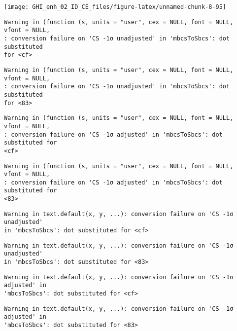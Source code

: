 \documentclass[
  10pt,
  a4paper,oneside]{article}
\begin{document}
\begin{center}\texttt{[image: GHI\_enh\_02\_ID\_CE\_files/figure-latex/unnamed-chunk-8-95]} \end{center}

\begin{verbatim}
Warning in (function (s, units = "user", cex = NULL, font = NULL, vfont = NULL,
: conversion failure on 'CS -1σ unadjusted' in 'mbcsToSbcs': dot substituted
for <cf>
\end{verbatim}

\begin{verbatim}
Warning in (function (s, units = "user", cex = NULL, font = NULL, vfont = NULL,
: conversion failure on 'CS -1σ unadjusted' in 'mbcsToSbcs': dot substituted
for <83>
\end{verbatim}

\begin{verbatim}
Warning in (function (s, units = "user", cex = NULL, font = NULL, vfont = NULL,
: conversion failure on 'CS -1σ adjusted' in 'mbcsToSbcs': dot substituted for
<cf>
\end{verbatim}

\begin{verbatim}
Warning in (function (s, units = "user", cex = NULL, font = NULL, vfont = NULL,
: conversion failure on 'CS -1σ adjusted' in 'mbcsToSbcs': dot substituted for
<83>
\end{verbatim}

\begin{verbatim}
Warning in text.default(x, y, ...): conversion failure on 'CS -1σ unadjusted'
in 'mbcsToSbcs': dot substituted for <cf>
\end{verbatim}

\begin{verbatim}
Warning in text.default(x, y, ...): conversion failure on 'CS -1σ unadjusted'
in 'mbcsToSbcs': dot substituted for <83>
\end{verbatim}

\begin{verbatim}
Warning in text.default(x, y, ...): conversion failure on 'CS -1σ adjusted' in
'mbcsToSbcs': dot substituted for <cf>
\end{verbatim}

\begin{verbatim}
Warning in text.default(x, y, ...): conversion failure on 'CS -1σ adjusted' in
'mbcsToSbcs': dot substituted for <83>
\end{verbatim}
\end{document}

